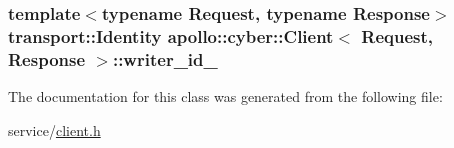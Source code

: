 \hypertarget{classapollo_1_1cyber_1_1Client_a9b8f371424fa143d2dff7397fdfdc177}{
\subsubsection[{writer\-\_\-id\-\_\-}]{\setlength{\rightskip}{0pt plus 5cm}template$<$typename Request, typename Response$>$ {\bf transport\-::\-Identity} {\bf apollo\-::cyber\-::\-Client}$<$ Request, Response $>$\-::writer\-\_\-id\-\_\-\hspace{0.3cm}{\ttfamily [private]}}}\label{classapollo_1_1cyber_1_1Client_a9b8f371424fa143d2dff7397fdfdc177}


The documentation for this class was generated from the following file\-:\begin{DoxyCompactItemize}
\item 
service/\hyperlink{client_8h}{client.\-h}\end{DoxyCompactItemize}
